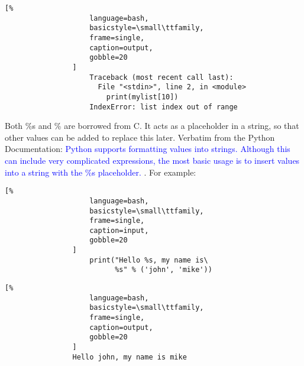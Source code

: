 \documentclass[crop=false,class=book]{standalone}
\begin{document}
            \begin{minipage}[t]{.48\textwidth}
                \centering
                \begin{lstlisting}[%
                    language=bash,
                    basicstyle=\small\ttfamily,
                    frame=single,
                    caption=output,
                    gobble=20
                ]
                    Traceback (most recent call last):
                      File "<stdin>", line 2, in <module>
                        print(mylist[10])
                    IndexError: list index out of range
                \end{lstlisting}
            \end{minipage}
            Both \%s and \% are borrowed from C. It acts as a
            placeholder in a string, so that other values can be
            added to replace this later. Verbatim from the Python
            Documentation:\newline
            \textcolor{blue}{%
                Python supports formatting values into strings.
                Although this can include very complicated
                expressions, the most basic usage is to insert
                values into a string with the \%s placeholder.
            }.\newline
            For example:\newline
            \begin{minipage}[t]{.48\textwidth}
                \centering
                \begin{lstlisting}[%
                    language=bash,
                    basicstyle=\small\ttfamily,
                    frame=single,
                    caption=input,
                    gobble=20
                ]
                    print("Hello %s, my name is\
                          %s" % ('john', 'mike'))
                \end{lstlisting}
            \end{minipage}\hfill
            \begin{minipage}[t]{.48\textwidth}
                \centering
                \begin{lstlisting}[%
                    language=bash,
                    basicstyle=\small\ttfamily,
                    frame=single,
                    caption=output,
                    gobble=20
                ]
                Hello john, my name is mike
                \end{lstlisting}
            \end{minipage}
\end{document}

